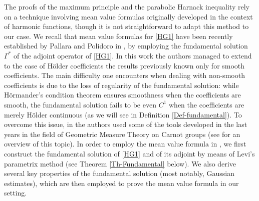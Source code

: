 \documentclass[11pt,a4paper]{article}
\numberwithin{equation}{section}
\def \G {{\Gamma}}
\begin{document}
The proofs of the maximum principle and the parabolic Harnack inequality rely on a technique involving mean value formulas originally developed in the context of harmonic functions, though it is not straightforward to adapt this method to our case. We recall that mean value formulas for \eqref{HG1} have been recently established by Pallara and Polidoro in \cite{pallara2023meanvalueformulasclassical}, by employing the fundamental solution $\G^*$ of the adjoint operator of \eqref{HG1}. In this work the authors managed to extend to the case of H\"older coefficients the results previously known only for smooth coefficients. The main difficulty one encounters when dealing with non-smooth coefficients is due to the loss of regularity of the fundamental solution: while H\"ormander's condition theorem ensures smoothness when the coefficients are smooth, the fundamental solution fails to be even $C^1$ when the coefficients are merely H\"older continuous (as we will see in Definition \ref{Def-fundamental}). To overcome this issue, in \cite{pallara2023meanvalueformulasclassical} the authors used some of the tools developed in the last years in the field of Geometric Measure Theory on Carnot groups (see \cite{cassano2016some} for an overview of this topic). In order to employ the mean value formula in \cite{pallara2023meanvalueformulasclassical}, we first construct the fundamental solution of \eqref{HG1} and of its adjoint by means of Levi's parametrix method \cite{levi1907sulle,levi1909problemi} (see Theorem \ref{Th-Fundamental} below). We also derive several key properties of the fundamental solution (most notably, Gaussian estimates), which are then employed to prove the mean value formula in our setting. 
\end{document}
